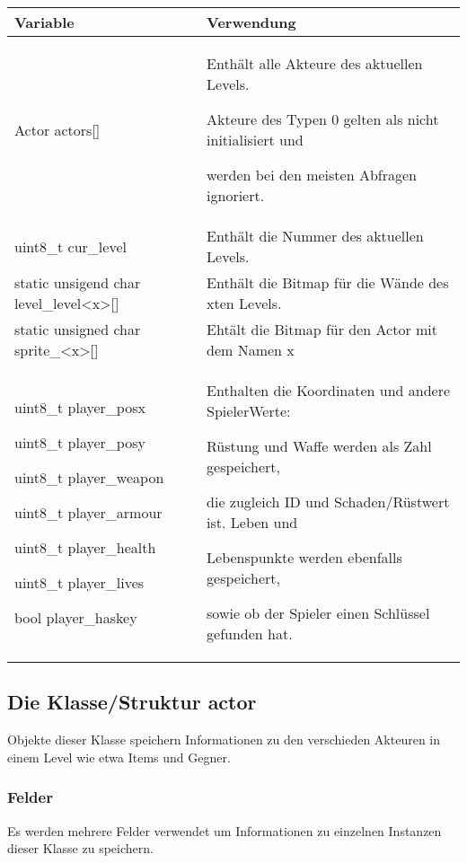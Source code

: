 \documentclass[letterpaper,10pt,ngerman]{sphinxmanual}
\begin{document}
\begin{savenotes}\sphinxattablestart
\centering
\begin{tabulary}{\linewidth}[t]{|T|T|}
\hline

Variable
&
Verwendung
\\
\hline
Actor actors{[}{]}
&
Enthält alle Akteure
des aktuellen
Levels.

Akteure des Typen 0
gelten als nicht
initialisiert und

werden bei den
meisten Abfragen
ignoriert.
\\
\hline
uint8\_t cur\_level
&
Enthält die Nummer
des aktuellen
Levels.
\\
\hline
static unsigend char
level\_level\textless{}x\textgreater{}{[}{]}
&
Enthält die Bitmap
für die Wände des
x\sphinxhyphen{}ten Levels.
\\
\hline
static unsigned char
sprite\_\textless{}x\textgreater{}{[}{]}
&
Ehtält die Bitmap
für den Actor mit
dem Namen x
\\
\hline
uint8\_t player\_posx

uint8\_t player\_posy

uint8\_t player\_weapon

uint8\_t player\_armour

uint8\_t player\_health

uint8\_t player\_lives

bool player\_haskey
&
Enthalten die
Koordinaten und
andere Spieler\sphinxhyphen{}Werte:

Rüstung
und Waffe werden als
Zahl gespeichert,

die zugleich ID und
Schaden/Rüstwert
ist. Leben und

Lebenspunkte werden
ebenfalls gespeichert,

sowie ob der Spieler
einen Schlüssel
gefunden hat.
\\
\hline
\end{tabulary}
\par
\sphinxattableend\end{savenotes}


\subsection{Die Klasse/Struktur actor}
\label{\detokenize{programming:die-klasse-struktur-actor}}
Objekte dieser Klasse speichern Informationen zu den verschieden Akteuren in
einem Level wie etwa Items und Gegner.


\subsubsection{Felder}
\label{\detokenize{programming:felder}}
Es werden mehrere Felder verwendet um Informationen zu einzelnen Instanzen
dieser Klasse zu speichern.
\end{document}
